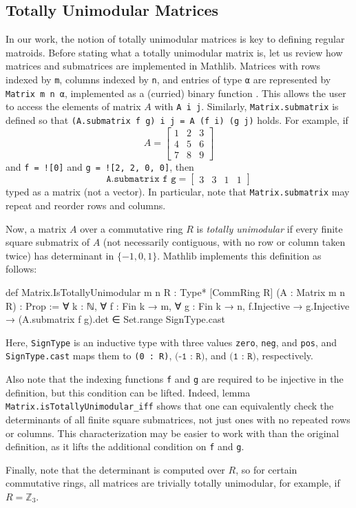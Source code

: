 \subsection{Totally Unimodular Matrices}

In our work, the notion of totally unimodular matrices is key to defining regular matroids. Before stating what a totally unimodular matrix is, let us review how matrices and submatrices are implemented in Mathlib. Matrices with rows indexed by \texttt{m}, columns indexed by \texttt{n}, and entries of type \texttt{α} are represented by \texttt{Matrix m n α}, implemented as a (curried) binary function . This allows the user to access the elements of matrix $A$ with \texttt{A i j}. Similarly, \texttt{Matrix.submatrix} is defined so that \texttt{(A.submatrix f g) i j = A (f i) (g j)} holds. For example, if
\[
    A = \begin{bmatrix}
       1 & 2 & 3 \\
       4 & 5 & 6 \\
       7 & 8 & 9
    \end{bmatrix}
\]
and \texttt{f = ![0]} and \texttt{g = ![2, 2, 0, 0]}, then
\[
    \texttt{A.submatrix f g} =
    \begin{bmatrix}
       3 & 3 & 1 & 1
    \end{bmatrix}
\]
typed as a matrix (not a vector). In particular, note that \texttt{Matrix.submatrix} may repeat and reorder rows and columns.

Now, a matrix $A$ over a commutative ring $R$ is \emph{totally unimodular} if every finite square submatrix of $A$ (not necessarily contiguous, with no row or column taken twice) has determinant in $\{-1, 0, 1\}$. Mathlib implements this definition as follows:
\begin{leancode}
def Matrix.IsTotallyUnimodular {m n R : Type*}
    [CommRing R] (A : Matrix m n R) :
    Prop :=
  ∀ k : ℕ, ∀ f : Fin k → m, ∀ g : Fin k → n,
    f.Injective → g.Injective →
      (A.submatrix f g).det ∈
        Set.range SignType.cast
\end{leancode}
Here, \texttt{SignType} is an inductive type with three values \texttt{zero}, \texttt{neg}, and \texttt{pos}, and \texttt{SignType.cast} maps them to \texttt{(0 : R)}, $\texttt{(-1 : R)}$, and $\texttt{(1 : R)}$, respectively.

Also note that the indexing functions \texttt{f} and \texttt{g} are required to be injective in the definition, but this condition can be lifted. Indeed, lemma \texttt{Matrix.isTotallyUnimodular\_iff} shows that one can equivalently check the determinants of all finite square submatrices, not just ones with no repeated rows or columns. This characterization may be easier to work with than the original definition, as it lifts the additional condition on \texttt{f} and \texttt{g}.

Finally, note that the determinant is computed over $R$, so for certain commutative rings, all matrices are trivially totally unimodular, for example, if $R = \mathbb{Z}_{3}$.
